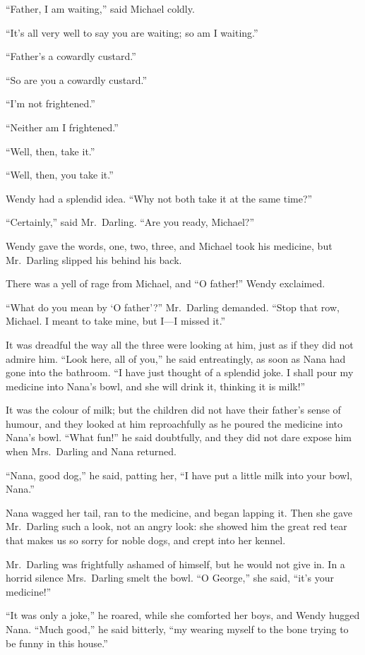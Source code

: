 ``Father, I am waiting,'' said Michael coldly.

``It's all very well to say you are waiting; so am I waiting.''

``Father's a cowardly custard.''

``So are you a cowardly custard.''

``I'm not frightened.''

``Neither am I frightened.''

``Well, then, take it.''

``Well, then, you take it.''

Wendy had a splendid idea. ``Why not both take it at the same time?''

``Certainly,'' said Mr.\ Darling. ``Are you ready, Michael?''

Wendy gave the words, one, two, three, and Michael took his medicine, but
Mr.\ Darling slipped his behind his back.

There was a yell of rage from Michael, and ``O father!'' Wendy exclaimed.

``What do you mean by `O father'?'' Mr.\ Darling demanded. ``Stop that row,
Michael. I meant to take mine, but I—I missed it.''

It was dreadful the way all the three were looking at him, just as if they did
not admire him. ``Look here, all of you,'' he said entreatingly, as soon as Nana
had gone into the bathroom. ``I have just thought of a splendid joke. I shall
pour my medicine into Nana's bowl, and she will drink it, thinking it is milk!''

It was the colour of milk; but the children did not have their father's sense of
humour, and they looked at him reproachfully as he poured the medicine into
Nana's bowl. ``What fun!'' he said doubtfully, and they did not dare expose him
when Mrs.\ Darling and Nana returned.

``Nana, good dog,'' he said, patting her, ``I have put a little milk into your
bowl, Nana.''

Nana wagged her tail, ran to the medicine, and began lapping it. Then she gave
Mr.\ Darling such a look, not an angry look: she showed him the great red tear
that makes us so sorry for noble dogs, and crept into her kennel.

Mr.\ Darling was frightfully ashamed of himself, but he would not give in. In a
horrid silence Mrs.\ Darling smelt the bowl. ``O George,'' she said, ``it's your
medicine!''

``It was only a joke,'' he roared, while she comforted her boys, and Wendy
hugged Nana. ``Much good,'' he said bitterly, ``my wearing myself to the bone
trying to be funny in this house.''


